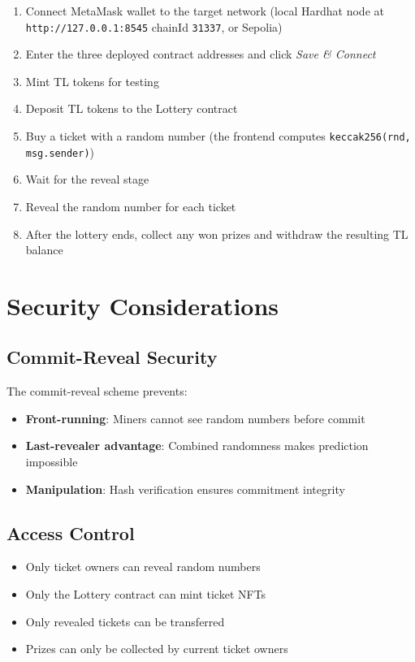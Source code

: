 \documentclass[12pt,a4paper]{article}
\begin{document}
\begin{enumerate}
    \item Connect MetaMask wallet to the target network (local Hardhat node at \texttt{http://127.0.0.1:8545} chainId \texttt{31337}, or Sepolia)
    \item Enter the three deployed contract addresses and click \textit{Save \& Connect}
    \item Mint TL tokens for testing
    \item Deposit TL tokens to the Lottery contract
    \item Buy a ticket with a random number (the frontend computes \texttt{keccak256(rnd, msg.sender)})
    \item Wait for the reveal stage
    \item Reveal the random number for each ticket
    \item After the lottery ends, collect any won prizes and withdraw the resulting TL balance
\end{enumerate}

\section{Security Considerations}

\subsection{Commit-Reveal Security}

The commit-reveal scheme prevents:
\begin{itemize}
    \item \textbf{Front-running}: Miners cannot see random numbers before commit
    \item \textbf{Last-revealer advantage}: Combined randomness makes prediction impossible
    \item \textbf{Manipulation}: Hash verification ensures commitment integrity
\end{itemize}

\subsection{Access Control}

\begin{itemize}
    \item Only ticket owners can reveal random numbers
    \item Only the Lottery contract can mint ticket NFTs
    \item Only revealed tickets can be transferred
    \item Prizes can only be collected by current ticket owners
\end{itemize}
\end{document}
